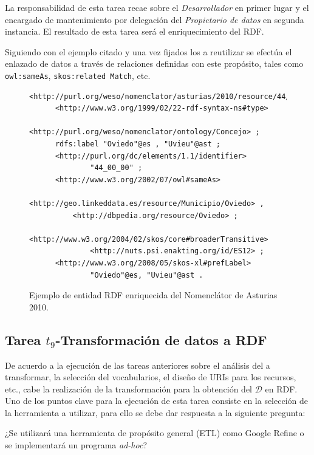 La responsabilidad de esta tarea recae sobre el \textit{Desarrollador} en primer lugar y el encargado de mantenimiento por delegación del 
\textit{Propietario de datos} en segunda instancia. El resultado de esta tarea será el enriquecimiento
del \dataset \gls{RDF}.

Siguiendo con el ejemplo citado y una vez fijados los \datasets a reutilizar se efectúa 
el enlazado de datos a través de relaciones definidas con este propósito, tales como \texttt{owl:sameAs}, \texttt{skos:related \linebreak Match}, etc.

\begin{figure}[!htp]
\begin{lstlisting} 
<http://purl.org/weso/nomenclator/asturias/2010/resource/44/00/00>
      <http://www.w3.org/1999/02/22-rdf-syntax-ns#type>
              <http://purl.org/weso/nomenclator/ontology/Concejo> ;
      rdfs:label "Oviedo"@es , "Uvieu"@ast ;
      <http://purl.org/dc/elements/1.1/identifier>
              "44_00_00" ;
      <http://www.w3.org/2002/07/owl#sameAs>
              <http://geo.linkeddata.es/resource/Municipio/Oviedo> , 
	      <http://dbpedia.org/resource/Oviedo> ;
      <http://www.w3.org/2004/02/skos/core#broaderTransitive>
              <http://nuts.psi.enakting.org/id/ES12> ;
      <http://www.w3.org/2008/05/skos-xl#prefLabel>
              "Oviedo"@es, "Uvieu"@ast .
\end{lstlisting}
	\caption{Ejemplo de entidad RDF enriquecida del Nomenclátor de Asturias 2010.}
	\label{fig:modelo-nomen-template}
\end{figure}

\subsection{Tarea $t_9$-Transformación de datos a RDF}
De acuerdo a la ejecución de las tareas anteriores sobre el análisis 
del \dataset a transformar, la selección del vocabularios, el diseño 
de \gls{URI}s para los recursos, etc., cabe la realización de la transformación 
para la obtención del \dataset $\mathcal{D}$ en \gls{RDF}. Uno de los puntos 
clave para la ejecución de esta tarea consiste en la selección de la 
herramienta a utilizar, para ello se debe dar respuesta a la siguiente pregunta:

¿Se utilizará una herramienta de propósito general (\gls{ETL}) como Google \gls{Refine} o se 
implementará un programa \textit{ad-hoc}?

